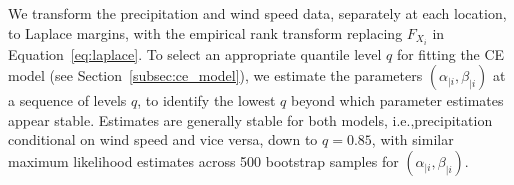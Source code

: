 \documentclass[12pt,compact]{article}
\DeclareMathOperator{\CE}{\mathrm{CE}}
\begin{document}
We transform the precipitation and wind speed data, separately at each location, to Laplace margins, with the empirical rank transform replacing $F_{X_i}$ in Equation~\eqref{eq:laplace}.
To select an appropriate quantile level $q$ for fitting the CE model (see Section~\ref{subsec:ce_model}), we estimate the parameters $(\alpha_{\mid i}, \beta_{\mid i})$ at a sequence of levels $q$, to identify the lowest $q$ beyond which parameter estimates appear stable.
Estimates are generally stable for both models, i.e.,\@ precipitation conditional on wind speed and vice versa, down to $q = 0.85$, with similar maximum likelihood estimates across 500 bootstrap samples for $(\alpha_{\mid i}, \beta_{\mid i})$. %
\end{document}
